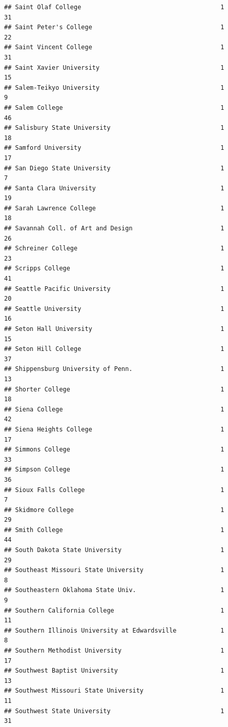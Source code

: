 \documentclass[
]{article}
\begin{document}
\begin{verbatim}
## Saint Olaf College                                      1          31
## Saint Peter's College                                   1          22
## Saint Vincent College                                   1          31
## Saint Xavier University                                 1          15
## Salem-Teikyo University                                 1           9
## Salem College                                           1          46
## Salisbury State University                              1          18
## Samford University                                      1          17
## San Diego State University                              1           7
## Santa Clara University                                  1          19
## Sarah Lawrence College                                  1          18
## Savannah Coll. of Art and Design                        1          26
## Schreiner College                                       1          23
## Scripps College                                         1          41
## Seattle Pacific University                              1          20
## Seattle University                                      1          16
## Seton Hall University                                   1          15
## Seton Hill College                                      1          37
## Shippensburg University of Penn.                        1          13
## Shorter College                                         1          18
## Siena College                                           1          42
## Siena Heights College                                   1          17
## Simmons College                                         1          33
## Simpson College                                         1          36
## Sioux Falls College                                     1           7
## Skidmore College                                        1          29
## Smith College                                           1          44
## South Dakota State University                           1          29
## Southeast Missouri State University                     1           8
## Southeastern Oklahoma State Univ.                       1           9
## Southern California College                             1          11
## Southern Illinois University at Edwardsville            1           8
## Southern Methodist University                           1          17
## Southwest Baptist University                            1          13
## Southwest Missouri State University                     1          11
## Southwest State University                              1          31

\end{verbatim}
\end{document}
